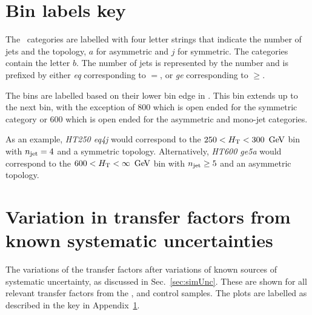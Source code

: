 \clearpage
\section{Bin labels key}
\label{app:plotKey}

The \nj ~categories are labelled with four letter strings that indicate
the number of jets and the topology, $a$ for asymmetric and $j$ for
symmetric. The \nb categories contain the letter $b$. The number of
jets is represented by the number and is prefixed by either \emph{eq}
corresponding to $=$, or \emph{ge} corresponding to $\geq$.

The \HT bins are labelled based on their lower bin edge in \gev. This
bin extends up to the next \HT bin, with the exception of $800$ which
is open ended for the symmetric category or $600$ which is open ended
for the asymmetric and mono-jet categories.

As an example, \emph{HT250 eq4j} would correspond to the
$250<\mbox{$H_\text{T}$}<300~\mathrm{\,Ge\kern -0.1em V}$ bin with $n_{\mathrm{jet}}=4$ and a symmetric topology.
Alternatively, \emph{HT600 ge5a} would correspond to the
$600<\mbox{$H_\text{T}$}<\infty~\mathrm{\,Ge\kern -0.1em V}$ bin with $n_{\mathrm{jet}}\geq5$ and an asymmetric topology.

\section{Variation in transfer factors from known systematic
uncertainties}
\label{app:tfSysts}

The variations of the transfer factors after variations of known
sources of systematic uncertainty, as discussed in
Sec.~\ref{sec:simUnc}. These are shown for all relevant transfer
factors from the \gj, \mj and \mmj control samples. The plots are
labelled as described in the key in Appendix~\ref{app:plotKey}.

